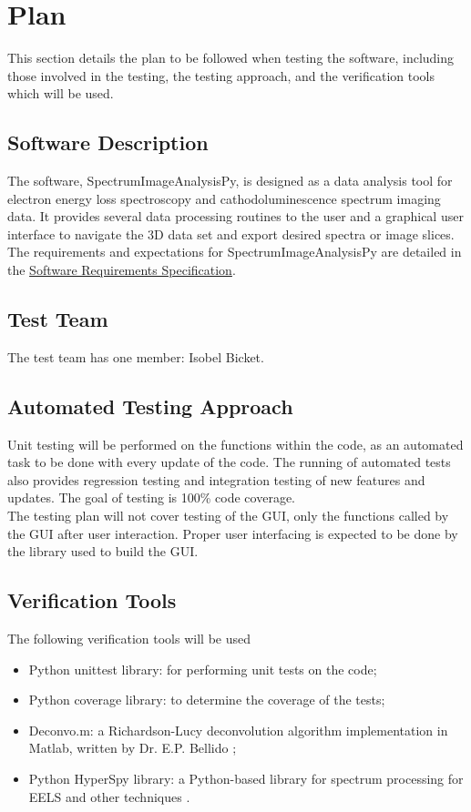 \documentclass[12pt, titlepage]{article}
\newcommand{\progname}{SpectrumImageAnalysisPy}
\begin{document}
\section{Plan}
This section details the plan to be followed when testing the software, including those involved in the testing, the testing approach, and the verification tools which will be used.
	
\subsection{Software Description}
The software, \progname{}, is designed as a data analysis tool for electron energy loss spectroscopy and cathodoluminescence spectrum imaging data. It provides several data processing routines to the user and a graphical user interface to navigate the 3D data set and export desired spectra or image slices. The requirements and expectations for \progname{} are detailed in the \hyperref[doc:SRS]{Software Requirements Specification}.

\subsection{Test Team}
The test team has one member: Isobel Bicket.

\subsection{Automated Testing Approach}

Unit testing will be performed on the functions within the code, as an automated task to be done with every update of the code. The running of automated tests also provides regression testing and integration testing of new features and updates. The goal of testing is 100\% code coverage.\\
The testing plan will not cover testing of the GUI, only the functions called by the GUI after user interaction. Proper user interfacing is expected to be done by the library used to build the GUI.\\

\subsection{Verification Tools}

The following verification tools will be used
\begin{itemize}
	\item Python unittest library: for performing unit tests on the code;
	\item Python coverage library: to determine the coverage of the tests;
	\item Deconvo.m: a Richardson-Lucy deconvolution algorithm implementation in Matlab, written by Dr. E.P. Bellido \cite{bellido_toward_2014};
	\item Python HyperSpy library: a Python-based library for spectrum processing for EELS and other techniques \cite{francisco_de_la_pena_2017_583693}.
\end{itemize}
\end{document}
